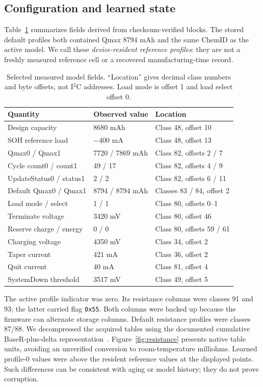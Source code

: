 \documentclass[11pt,a4paper]{article}
\newcommand{\hex}[1]{\texttt{0x#1}}
\begin{document}
\subsection{Configuration and learned state}
Table~\ref{tab:model} summarizes fields derived from checksum-verified blocks. The stored default profiles both contained Qmax 8794 mAh and the same ChemID as the active model. We call these \emph{device-resident reference profiles}: they are not a freshly measured reference cell or a recovered manufacturing-time record.

\begin{table}[htbp]\centering\small
\begin{tabular}{lll}\toprule
Quantity & Observed value & Location\\\midrule
Design capacity & 8680 mAh & Class 48, offset 10\\
SOH reference load & $-400$ mA & Class 48, offset 13\\
Qmax0 / Qmax1 & 7720 / 7869 mAh & Class 82, offsets 2 / 7\\
Cycle count0 / count1 & 49 / 17 & Class 82, offsets 4 / 9\\
UpdateStatus0 / status1 & 2 / 2 & Class 82, offsets 6 / 11\\
Default Qmax0 / Qmax1 & 8794 / 8794 mAh & Classes 83 / 84, offset 2\\
Load mode / select & 1 / 1 & Class 80, offsets 0--1\\
Terminate voltage & 3420 mV & Class 80, offset 46\\
Reserve charge / energy & 0 / 0 & Class 80, offsets 59 / 61\\
Charging voltage & 4350 mV & Class 34, offset 2\\
Taper current & 421 mA & Class 36, offset 2\\
Quit current & 40 mA & Class 81, offset 4\\
SystemDown threshold & 3517 mV & Class 49, offset 5\\\bottomrule
\end{tabular}
\caption{Selected measured model fields. ``Location'' gives decimal class numbers and byte offsets, not I$^2$C addresses. Load mode is offset 1 and load select offset 0.}\label{tab:model}
\end{table}

The active profile indicator was zero. Its resistance columns were classes 91 and 93; the latter carried flag \hex{55}. Both columns were backed up because the firmware can alternate storage columns. Default resistance profiles were classes 87/88. We decompressed the acquired tables using the documented cumulative BaseR-plus-delta representation~\cite{ti-theory}. Figure~\ref{fig:resistance} presents native table units, avoiding an unverified conversion to room-temperature milliohms. Learned profile-0 values were above the resident reference values at the displayed points. Such differences can be consistent with aging or model history; they do not prove corruption.
\end{document}
